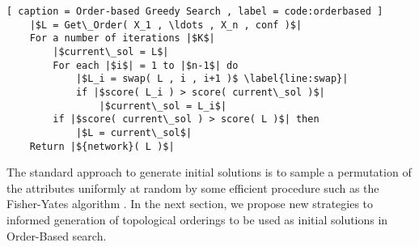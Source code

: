 \begin{lstlisting}[ caption = Order-based Greedy Search , label = code:orderbased ]
	|$L = Get\_Order( X_1 , \ldots , X_n , conf )$|
	For a number of iterations |$K$|
		|$current\_sol = L$|
		For each |$i$| = 1 to |$n-1$| do
			|$L_i = swap( L , i , i+1 )$ \label{line:swap}|
			if |$score( L_i ) > score( current\_sol )$|
				|$current\_sol = L_i$|
		if |$score( current\_sol ) > score( L )$| then
			|$L = current\_sol$|
	Return |${network}( L )$|
\end{lstlisting}

The standard approach to generate initial solutions is to sample a permutation of the attributes uniformly at random by some efficient procedure such as the Fisher-Yates algorithm \cite{FisherYates98}. In the next section, we propose new strategies to informed generation of topological orderings to be used as initial solutions in Order-Based search.

